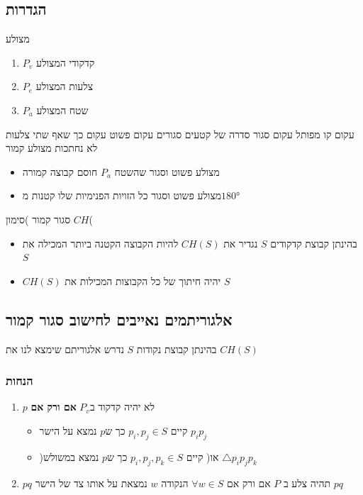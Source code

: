 \documentclass{article}
\makeatletter
\newcommand*{\saved@uline}{}
\let\saved@uline\uline
\newcommand*{\mathuline}{%
  \mathpalette{\math@uline\saved@uline}%
}
\newcommand*{\math@uline}[3]{%
  \mbox{#1{$#2#3\m@th$}}%
}
\renewcommand*{\uline}{%
  \relax  
  \ifmmode
    \expandafter\mathuline
  \else
    \expandafter\saved@uline
  \fi
}
\makeatother
\begin{document}
\subsection{הגדרות}
\uline{מצולע}
\begin{enumerate}
\item $P_v$ קדקודי המצולע
\item $P_e$ צלעות המצולע
\item $P_a$ שטח המצולע
\end{enumerate}
\uline{עקום} קו מפותל
\newline\uline{עקום סגור} סדרה של קטעים סגורים
\newline\uline{עקום פשוט} עקום כך שאף שתי צלעות לא נחתכות
\uline{מצולע קמור}
\begin{itemize}
\item מצולע פשוט וסגור שהשטח $P_a$ חוסם קבוצה קמורה
\item מצולע פשוט וסגור כל הזויות הפנימיות שלו קטנות מ$\ang{180}$
\end{itemize}

\uline{ סגור קמור )סימון $CH$(}
\begin{itemize}
\item בהינתן קבוצת קדקודים $S$ נגדיר את $CH(S)$ להיות הקבוצה הקטנה ביותר המכילה את $S$
\item $CH(S)$ יהיה חיתוך של כל הקבוצות המכילות את $S$
\end{itemize}


\subsection{אלגוריתמים נאייבים לחישוב סגור קמור}
בהינתן קבוצת נקודות $S$ נדרש אלגוריתם שימצא לנו את $CH(S)$
\subsubsection{הנחות}
\begin{enumerate}
\item $p$ לא יהיה קדקוד ב$P_v$ \textbf{אם ורק אם}
\begin{itemize}
\item קיים $p_i,p_j \in S$ כך ש$p$ נמצא על הישר $p_ip_j$
\item )או( קיים $p_i,p_j,p_k \in S$ כך ש$p$ נמצא במשולש $\triangle p_ip_jp_k$
\end{itemize}
\item $pq$ תהיה צלע ב $P$ אם ורק אם  $\forall w \in S$ הנקודה $w$ נמצאת על אותו צד של הישר $pq$ 
\end{enumerate}
\end{document}
